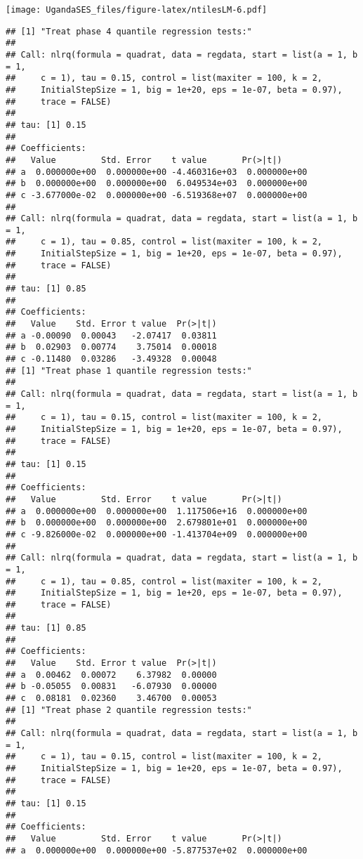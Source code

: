 \documentclass[
]{article}
\begin{document}
\texttt{[image: UgandaSES\_files/figure-latex/ntilesLM-6.pdf]}

\begin{verbatim}
## [1] "Treat phase 4 quantile regression tests:"
## 
## Call: nlrq(formula = quadrat, data = regdata, start = list(a = 1, b = 1, 
##     c = 1), tau = 0.15, control = list(maxiter = 100, k = 2, 
##     InitialStepSize = 1, big = 1e+20, eps = 1e-07, beta = 0.97), 
##     trace = FALSE)
## 
## tau: [1] 0.15
## 
## Coefficients:
##   Value         Std. Error    t value       Pr(>|t|)     
## a  0.000000e+00  0.000000e+00 -4.460316e+03  0.000000e+00
## b  0.000000e+00  0.000000e+00  6.049534e+03  0.000000e+00
## c -3.677000e-02  0.000000e+00 -6.519368e+07  0.000000e+00
## 
## Call: nlrq(formula = quadrat, data = regdata, start = list(a = 1, b = 1, 
##     c = 1), tau = 0.85, control = list(maxiter = 100, k = 2, 
##     InitialStepSize = 1, big = 1e+20, eps = 1e-07, beta = 0.97), 
##     trace = FALSE)
## 
## tau: [1] 0.85
## 
## Coefficients:
##   Value    Std. Error t value  Pr(>|t|)
## a -0.00090  0.00043   -2.07417  0.03811
## b  0.02903  0.00774    3.75014  0.00018
## c -0.11480  0.03286   -3.49328  0.00048
## [1] "Treat phase 1 quantile regression tests:"
## 
## Call: nlrq(formula = quadrat, data = regdata, start = list(a = 1, b = 1, 
##     c = 1), tau = 0.15, control = list(maxiter = 100, k = 2, 
##     InitialStepSize = 1, big = 1e+20, eps = 1e-07, beta = 0.97), 
##     trace = FALSE)
## 
## tau: [1] 0.15
## 
## Coefficients:
##   Value         Std. Error    t value       Pr(>|t|)     
## a  0.000000e+00  0.000000e+00  1.117506e+16  0.000000e+00
## b  0.000000e+00  0.000000e+00  2.679801e+01  0.000000e+00
## c -9.826000e-02  0.000000e+00 -1.413704e+09  0.000000e+00
## 
## Call: nlrq(formula = quadrat, data = regdata, start = list(a = 1, b = 1, 
##     c = 1), tau = 0.85, control = list(maxiter = 100, k = 2, 
##     InitialStepSize = 1, big = 1e+20, eps = 1e-07, beta = 0.97), 
##     trace = FALSE)
## 
## tau: [1] 0.85
## 
## Coefficients:
##   Value    Std. Error t value  Pr(>|t|)
## a  0.00462  0.00072    6.37982  0.00000
## b -0.05055  0.00831   -6.07930  0.00000
## c  0.08181  0.02360    3.46700  0.00053
## [1] "Treat phase 2 quantile regression tests:"
## 
## Call: nlrq(formula = quadrat, data = regdata, start = list(a = 1, b = 1, 
##     c = 1), tau = 0.15, control = list(maxiter = 100, k = 2, 
##     InitialStepSize = 1, big = 1e+20, eps = 1e-07, beta = 0.97), 
##     trace = FALSE)
## 
## tau: [1] 0.15
## 
## Coefficients:
##   Value         Std. Error    t value       Pr(>|t|)     
## a  0.000000e+00  0.000000e+00 -5.877537e+02  0.000000e+00

\end{verbatim}
\end{document}
